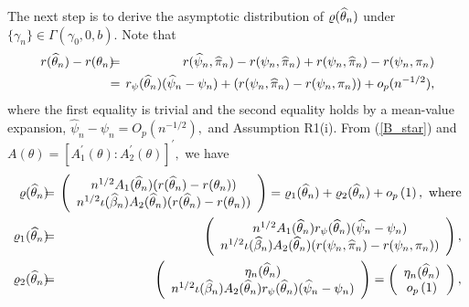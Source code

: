 \documentclass[12pt,titlepage,final,oneside,letterpaper]{article}
\begin{document}
The next step is to derive the asymptotic distribution of $\varrho (\widehat{%
\theta }_{n})$ under $\{\gamma _{n}\}\in \Gamma (\gamma _{0},0,b).$ Note that%
\begin{eqnarray}
r(\widehat{\theta }_{n})-r(\theta _{n})\hspace{-0.08in} &=&\hspace{-0.08in}r(%
\widehat{\psi }_{n},\widehat{\pi }_{n})-r(\psi _{n},\widehat{\pi }%
_{n})+r(\psi _{n},\widehat{\pi }_{n})-r(\psi _{n},\pi _{n})  \notag \\
&=&\hspace{-0.08in}r_{\psi }(\widehat{\theta }_{n})(\widehat{\psi }_{n}-\psi
_{n})+(r(\psi _{n},\widehat{\pi }_{n})-r(\psi _{n},\pi
_{n}))+o_{p}(n^{-1/2}),  \label{decomp}
\end{eqnarray}%
where the first equality is trivial and the second equality holds by a
mean-value expansion, $\widehat{\psi }_{n}-\psi _{n}=O_{p}(n^{-1/2}),$ and
Assumption R1(i). From (\ref{B_star}) and $A(\theta )=[A_{1}^{\prime
}(\theta ):A_{2}^{\prime }(\theta )]^{\prime },$ we have 
\begin{eqnarray}
\varrho (\widehat{\theta }_{n})\hspace{-0.08in} &=&\hspace{-0.08in}\left( 
\begin{array}{c}
n^{1/2}A_{1}(\widehat{\theta }_{n})(r(\widehat{\theta }_{n})-r(\theta _{n}))
\\ 
n^{1/2}\iota (\widehat{\beta }_{n})A_{2}(\widehat{\theta }_{n})(r(\widehat{%
\theta }_{n})-r(\theta _{n}))%
\end{array}%
\right) =\varrho _{1}(\widehat{\theta }_{n})+\varrho _{2}(\widehat{\theta }%
_{n})+o_{p}\left( 1\right) ,\text{ where}  \notag \\
\varrho _{1}(\widehat{\theta }_{n})\hspace{-0.08in} &=&\hspace{-0.08in}%
\left( 
\begin{array}{c}
n^{1/2}A_{1}(\widehat{\theta }_{n})r_{\psi }(\widehat{\theta }_{n})(\widehat{%
\psi }_{n}-\psi _{n}) \\ 
n^{1/2}\iota (\widehat{\beta }_{n})A_{2}(\widehat{\theta }_{n})(r(\psi _{n},%
\widehat{\pi }_{n})-r(\psi _{n},\pi _{n}))%
\end{array}%
\right) ,  \notag \\
\varrho _{2}(\widehat{\theta }_{n})\hspace{-0.08in} &=&\hspace{-0.08in}%
\left( 
\begin{array}{c}
\eta _{n}(\widehat{\theta }_{n}) \\ 
n^{1/2}\iota (\widehat{\beta }_{n})A_{2}(\widehat{\theta }_{n})r_{\psi }(%
\widehat{\theta }_{n})(\widehat{\psi }_{n}-\psi _{n})%
\end{array}%
\right) =\left( 
\begin{array}{c}
\eta _{n}(\widehat{\theta }_{n}) \\ 
o_{p}\left( 1\right)%
\end{array}%
\right) ,  \label{Varrho}
\end{eqnarray}%
\end{document}
